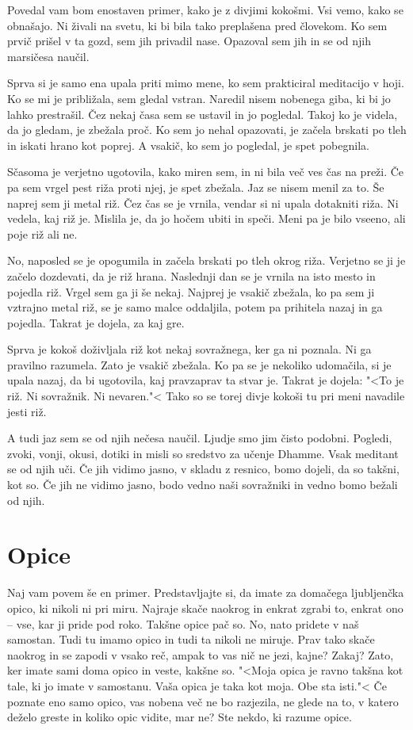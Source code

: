 Povedal vam bom enostaven primer, kako je z divjimi kokošmi. Vsi vemo, kako se obnašajo. Ni živali na svetu, ki bi bila tako preplašena pred človekom. Ko sem prvič prišel v ta gozd, sem jih privadil nase. Opazoval sem jih in se od njih marsičesa naučil.

Sprva si je samo ena upala priti mimo mene, ko sem prakticiral meditacijo v hoji. Ko se mi je približala, sem gledal vstran. Naredil nisem nobenega giba, ki bi jo lahko prestrašil. Čez nekaj časa sem se ustavil in jo pogledal. Takoj ko je videla, da jo gledam, je zbežala proč. Ko sem jo nehal opazovati, je začela brskati po tleh in iskati hrano kot poprej. A vsakič, ko sem jo pogledal, je spet pobegnila.

Sčasoma je verjetno ugotovila, kako miren sem, in ni bila več ves čas na preži. Če pa sem vrgel pest riža proti njej, je spet zbežala. Jaz se nisem menil za to. Še naprej sem ji metal riž. Čez čas se je vrnila, vendar si ni upala dotakniti riža. Ni vedela, kaj riž je. Mislila je, da jo hočem ubiti in speči. Meni pa je bilo vseeno, ali poje riž ali ne.

No, naposled se je opogumila in začela brskati po tleh okrog riža. Verjetno se ji je začelo dozdevati, da je riž hrana. Naslednji dan se je vrnila na isto mesto in pojedla riž. Vrgel sem ga ji še nekaj. Najprej je vsakič zbežala, ko pa sem ji vztrajno metal riž, se je samo malce oddaljila, potem pa prihitela nazaj in ga pojedla. Takrat je dojela, za kaj gre.

Sprva je kokoš doživljala riž kot nekaj sovražnega, ker ga ni poznala. Ni ga pravilno razumela. Zato je vsakič zbežala. Ko pa se je nekoliko udomačila, si je upala nazaj, da bi ugotovila, kaj pravzaprav ta stvar je. Takrat je dojela: "<To je riž. Ni sovražnik. Ni nevaren."< Tako so se torej divje kokoši tu pri meni navadile jesti riž.

A tudi jaz sem se od njih nečesa naučil. Ljudje smo jim čisto podobni. Pogledi, zvoki, vonji, okusi, dotiki in misli so sredstvo za učenje Dhamme. Vsak meditant se od njih uči. Če jih vidimo jasno, v skladu z resnico, bomo dojeli, da so takšni, kot so. Če jih ne vidimo jasno, bodo vedno naši sovražniki in vedno bomo bežali od njih.

\section{Opice}

Naj vam povem še en primer. Predstavljajte si, da imate za domačega ljubljenčka opico, ki nikoli ni pri miru. Najraje skače naokrog in enkrat zgrabi to, enkrat ono – vse, kar ji pride pod roko. Takšne opice pač so. No, nato pridete v naš samostan. Tudi tu imamo opico in tudi ta nikoli ne miruje. Prav tako skače naokrog in se zapodi v vsako reč, ampak to vas nič ne jezi, kajne? Zakaj? Zato, ker imate sami doma opico in veste, kakšne so. "<Moja opica je ravno takšna kot tale, ki jo imate v samostanu. Vaša opica je taka kot moja. Obe sta isti."< Če poznate eno samo opico, vas nobena več ne bo razjezila, ne glede na to, v katero deželo greste in koliko opic vidite, mar ne? Ste nekdo, ki razume opice.

